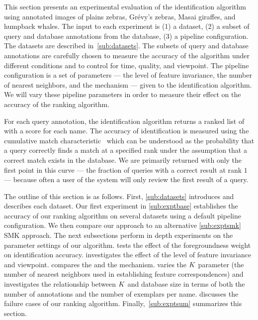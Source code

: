     This section presents an experimental evaluation of the identification algorithm using annotated images of
      plains zebras, Grévy's zebras, Masai giraffes, and humpback whales.
    The input to each experiment is
    (1) a dataset,
    (2) a subset of query and database annotations from the database,
    (3) a pipeline configuration.
    The datasets are described in~\cref{sub:datasets}.
    The subsets of query and database annotations are carefully chosen to measure the accuracy of the algorithm
      under different conditions and to control for time, quality, and viewpoint.
    The pipeline configuration is a set of parameters --- \eg{} the level of feature invariance, the number of
      nearest neighbors, and the \namescoring{} mechanism --- given to the identification algorithm.
    We will vary these pipeline parameters in order to measure their effect on the accuracy of the ranking
      algorithm.

    For each query annotation, the identification algorithm returns a ranked list of \names{} with a score for each
    name. The accuracy of identification is measured using the cumulative match
    characteristic~\cite{decann_relating_2013} which can be understood as the probability that a query correctly
    finds a match at a specified rank under the assumption that a correct match exists in the database. We are
    primarily returned with only the first point in this curve --- the fraction of queries with a correct result at
    rank $1$ --- because often a user of the system will only review the first result of a query.

    The outline of this section is as follows. First, \cref{sub:datasets} introduces and describes each dataset.
    Our first experiment in \cref{sub:exptbase} establishes the accuracy of our ranking algorithm on several
    datasets using a default pipeline configuration. We then compare our approach to an alternative
    \cref{sub:exptsmk} SMK approach. The next subsections perform in depth experiments on the parameter settings of
    our algorithm.  tests the effect of the foregroundness weight on identification accuracy.
     investigates the effect of the level of feature invariance and viewpoint.
     compares the \csumprefix{} and the \nsumprefix{} \namescoring{} mechanism.
     varies the $K$ parameter (the number of nearest neighbors used in establishing feature
    correspondences) and investigates the relationship between $K$ and database size in terms of both the number
    of annotations and the number of exemplars per name.  discusses the failure cases of our
    ranking algorithm. Finally,~\cref{sub:exptsum} summarizes this section.


